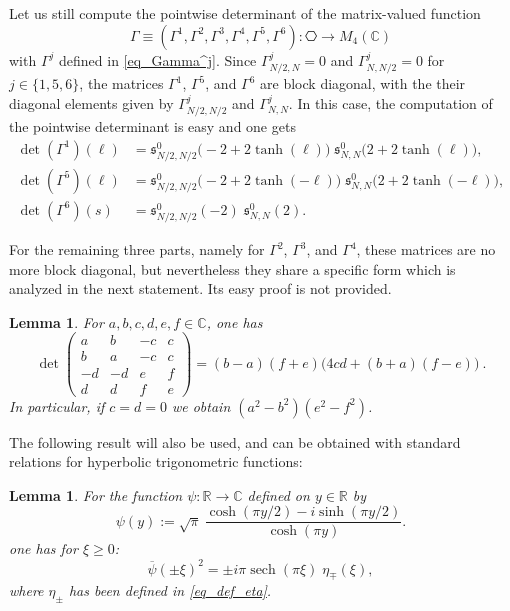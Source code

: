 \documentclass[11pt]{article}
\def\C{\mathbb C}
\def\R{\mathbb R}
\def\s{\mathfrak s}
\def\sech{\mathop{\mathrm{sech}}\nolimits}
\newtheorem{Lemma}[Theorem]{Lemma}
\begin{document}
Let us still compute the pointwise determinant of the matrix-valued function
$$
\Gamma\equiv (\Gamma^{1},\Gamma^{2},\Gamma^{3},\Gamma^{4},\Gamma^{5},\Gamma^{6}): \hexagon \to M_4(\C)
$$
with $\Gamma^j$ defined in \eqref{eq_Gamma^j}.
Since $\Gamma^j_{N/2,N}=0$ and $\Gamma^j_{N,N/2}=0$ for $j\in \{1, 5, 6\}$, the matrices
$\Gamma^1$,  $\Gamma^5$, and $\Gamma^6$ are block diagonal, with the their diagonal
elements given by $\Gamma^j_{N/2,N/2}$ and $\Gamma^j_{N,N}$. In this case, the computation
of the pointwise determinant is easy and one gets
\begin{align*}
\det (\Gamma^1)(\ell) & = \s^0_{N/2,N/2}\big(-2+2\tanh(\ell)\big)\;\!\s^0_{N,N}\big(2+2\tanh(\ell)\big), \\
\det (\Gamma^5)(\ell) & =\s^0_{N/2,N/2}\big(-2+2\tanh(-\ell)\big)\;\!\s^0_{N,N}\big(2+2\tanh(-\ell)\big), \\
\det (\Gamma^6)(s) & = \s^0_{N/2,N/2}(-2)\;\!\s^0_{N,N}(2).
\end{align*}

For the remaining three parts, namely for $\Gamma^2$, $\Gamma^3$, and $\Gamma^4$, 
these matrices are no more block diagonal, but nevertheless they share a specific form
which is analyzed in the next statement.
Its easy proof is not provided.

\begin{Lemma}\label{lemma_abc}
For $a,b,c,d,e,f\in \C$, one has
    \begin{equation}\label{eq_4mat}
        \det\begin{pmatrix}
a&b&-c&c\\
b&a&-c&c\\
-d&-d&e&f\\
d&d&f&e
        \end{pmatrix}=(b-a)(f+e)\big(4cd+(b+a)(f-e)\big)\ .
    \end{equation}
    In particular, if $c=d=0$ we obtain $(a^2-b^2)(e^2-f^2)$.
\end{Lemma}

The following result will also be used, and can be obtained with standard relations 
for hyperbolic trigonometric functions:

\begin{Lemma}
For the function $\psi:\R\to \C$ defined on $y\in \R$ by
$$
\psi(y):=\sqrt{\pi}\ \frac{\cosh(\pi y/2)-i\sinh(\pi y/2)}{\cosh(\pi y)}.
$$
one has for $\xi\geq 0$: 
\begin{equation}
\overline{\psi}(\pm\xi)^2=\pm i\pi \sech(\pi \xi)\;\!\eta_{\mp}(\xi) ,
\end{equation}
where $\eta_\pm$ has been defined in \eqref{eq_def_eta}.
\end{Lemma}
\end{document}
